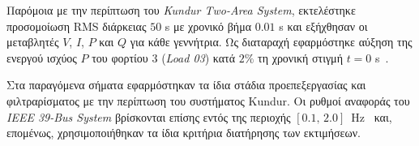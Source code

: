 \else
Παρόμοια με την περίπτωση του \textenglish{\textit{Kundur Two-Area System}}, εκτελέστηκε προσομοίωση \textenglish{RMS} διάρκειας $50$ s με χρονικό βήμα $0.01$ s και εξήχθησαν οι μεταβλητές $V$, $I$, $P$ και $Q$ για κάθε γεννήτρια. Ως διαταραχή εφαρμόστηκε αύξηση της ενεργού ισχύος $P$ του φορτίου $3$ (\textenglish{\textit{Load 03}}) κατά $2\%$ τη χρονική στιγμή $t=0$ s~\cite{digsilent39,sfetkos2024measurement}.

Στα παραγόμενα σήματα εφαρμόστηκαν τα ίδια στάδια προεπεξεργασίας και φιλτραρίσματος με την περίπτωση του συστήματος Kundur. Οι ρυθμοί αναφοράς του \textenglish{\textit{IEEE 39-Bus System}} βρίσκονται επίσης εντός της περιοχής $[0.1,\,2.0]$~Hz~\cite{sarkar2024drga} και, επομένως, χρησιμοποιήθηκαν τα ίδια κριτήρια διατήρησης των εκτιμήσεων.
\fi
